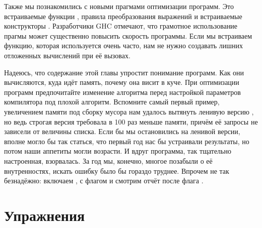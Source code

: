 Также мы познакомились с новыми прагмами оптимизации программ. Это
встраиваемые функции , правила преобразования выражений
 и встраиваемые конструкторы . Разработчики GHC
отмечают, что грамотное использование прагмы  может
существенно повысить скорость программы. Если мы встраиваем функцию,
которая используется очень часто, нам не нужно создавать лишних
отложенных вычислений при её вызовах.

Надеюсь, что содержание этой главы упростит понимание программ. Как они
вычисляются, куда идёт память, почему она висит в куче. При оптимизации
программ предпочитайте изменение алгоритма перед настройкой параметров
компилятора под плохой алгоритм. Вспомните самый первый пример,
увеличением памяти под сборку мусора нам удалось вытянуть ленивую версию
, но ведь строгая версия требовала в 100 раз меньше памяти,
причём её запросы не зависели от величины списка. Если бы мы
остановились на ленивой версии, вполне могло бы так статься, что первый
год нас бы устраивали результаты, но потом наши аппетиты могли возрасти.
И вдруг программа, так тщательно настроенная, взорвалась. За год мы,
конечно, многое позабыли о её внутренностях, искать ошибку было бы
гораздо труднее. Впрочем не так безнадёжно: включаем ,
 с флагом  и смотрим отчёт после флага .

\section{Упражнения}

